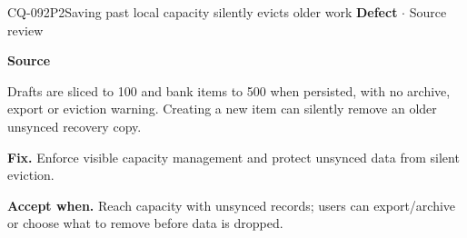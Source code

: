 \begin{finding}{CQ-092}{P2}{Saving past local capacity silently evicts older work}
\textbf{Defect} $\cdot$ Source review\par
\textbf{Source}\quad{}\par
Drafts are sliced to 100 and bank items to 500 when persisted, with no archive, export or eviction warning. Creating a new item can silently remove an older unsynced recovery copy.\par
\textbf{Fix.} Enforce visible capacity management and protect unsynced data from silent eviction.\par
\textbf{Accept when.} Reach capacity with unsynced records; users can export/archive or choose what to remove before data is dropped.
\end{finding}
\clearpage
